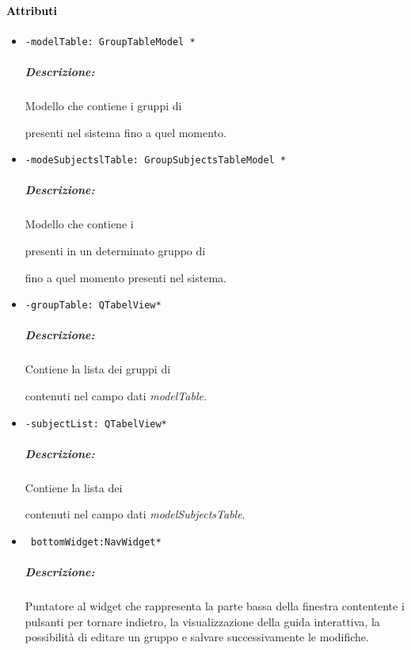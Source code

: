 \paragraph{\textcolor{black}{Attributi\\}}
\begin{itemize}
\item\color{teal}\verb!-modelTable: GroupTableModel *!
\color{black}
\subparagraph{Descrizione:}
Modello che contiene i gruppi di\subject{} presenti nel sistema fino a quel momento.

\item\color{teal}\verb!-modeSubjectslTable: GroupSubjectsTableModel *!
\color{black}
\subparagraph{Descrizione:}
Modello che contiene i \subject{} presenti in un determinato gruppo di \subject{} fino a quel momento presenti nel sistema.

\item\color{teal}\verb!-groupTable: QTabelView*!
\color{black}
\subparagraph{Descrizione:}
Contiene la lista dei gruppi di \subject{} contenuti nel campo dati \emph{modelTable}.

\item\color{teal}\verb!-subjectList: QTabelView*!
\color{black}
\subparagraph{Descrizione:}
Contiene la lista dei \subject{} contenuti nel campo dati \emph{modelSubjectsTable}.

\item\color{teal}\verb! bottomWidget:NavWidget*!
\color{black} 
\subparagraph{Descrizione:}
Puntatore al widget che rappresenta la parte bassa della finestra contentente i pulsanti per tornare indietro, la visualizzazione della guida interattiva, la possibilità di editare un gruppo e salvare successivamente le modifiche.
\end{itemize}
